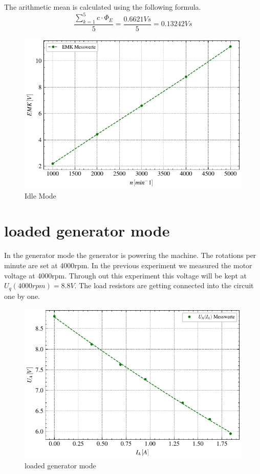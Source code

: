 \documentclass[conference]{IEEEtran}
\begin{document}
The arithmetic mean is calculated using the following formula.
\begin{equation}
    \frac{ \sum\limits_{k = 1}^{5} c \cdot \Phi_E}{5} = \frac{0.6621Vs}{5} = 0.13242Vs
\end{equation}




\begin{figure}[htbp]
    \centering
    \includegraphics[width=\columnwidth]{plots/4.1_Leerlaufversuch.pdf}
    \caption{Idle Mode}
    \label{fig:Anlaufmoment}
\end{figure}


\section{loaded generator mode}
In the generator mode the generator is powering the machine. The rotations per minute are set at 4000rpm.
In the previous experiment we measured the motor voltage at 4000rpm. Through out this experiment this voltage will be kept at $U_q(4000rpm) = 8.8V$.
The load resistors are getting connected into the circuit one by one.


\begin{figure}[htbp]
    \centering
    \includegraphics[width=\columnwidth]{plots/4.2_Belasteter_Generator_4000.pdf}
    \caption{loaded generator mode}
    \label{fig:Anlaufmoment}
\end{figure}
\end{document}
